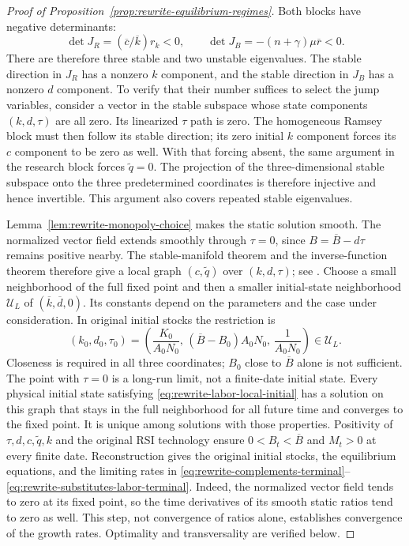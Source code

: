 \begin{proof}[Proof of Proposition~\ref{prop:rewrite-equilibrium-regimes}]
Both blocks have negative determinants:
\[
 \det J_R=(\overline c/\overline k)r_k<0,\qquad
 \det J_B=-(n+\gamma)\mu\overline r<0.
\]
There are therefore three stable and two unstable eigenvalues. The stable
direction in $J_R$ has a nonzero $k$ component, and the stable direction in
$J_B$ has a nonzero $d$ component. To verify that their number suffices to
select the jump variables, consider a vector in the stable subspace whose
state components $(k,d,\tau)$ are all zero. Its linearized $\tau$ path is
zero. The homogeneous Ramsey block must then follow its stable direction;
its zero initial $k$ component forces its $c$ component to be zero as well.
With that forcing absent, the same argument in the research block forces
$\widetilde q=0$. The projection of the three-dimensional stable subspace
onto the three predetermined coordinates is therefore injective and hence
invertible. This argument also covers repeated stable eigenvalues.

Lemma~\ref{lem:rewrite-monopoly-choice} makes the static solution smooth.
The normalized vector field extends smoothly through $\tau=0$, since
$B=\overline B-d\tau$ remains positive nearby. The stable-manifold theorem
and the inverse-function theorem therefore give a local graph
$(c,\widetilde q)$ over $(k,d,\tau)$; see \citet{dyatlov2018}.
Choose a small neighborhood of the full fixed point and then a smaller
initial-state neighborhood $\mathcal U_L$ of
$(\overline k,\overline d,0)$. Its constants depend on the parameters
and the case under consideration. In original initial stocks the restriction is
\begin{equation}
 (k_0,d_0,\tau_0)=
 \left(\frac{K_0}{A_0N_0},\,
       (\overline B-B_0)A_0N_0,\,
       \frac{1}{A_0N_0}\right)\in\mathcal U_L.
 \label{eq:rewrite-labor-local-initial}
\end{equation}
Closeness is required in all three coordinates; $B_0$ close to
$\overline B$ alone is not sufficient. The point with $\tau=0$
is a long-run limit, not a finite-date initial state.
Every physical initial state satisfying
\eqref{eq:rewrite-labor-local-initial} has a solution on this
graph that stays in the full neighborhood for all future time and converges
to the fixed point. It is unique among solutions with those properties.
Positivity of $\tau,d,c,\widetilde q,k$ and the original RSI technology
ensure $0<B_t<\overline B$ and $M_t>0$ at every finite date.
Reconstruction gives the original initial stocks, the equilibrium equations,
and the limiting rates in
\eqref{eq:rewrite-complements-terminal}--\eqref{eq:rewrite-substitutes-labor-terminal}.
Indeed, the normalized vector field tends to zero at its fixed point, so
the time derivatives of its smooth static ratios tend to zero as well.
This step, not convergence of ratios alone, establishes convergence of
the growth rates.
Optimality and transversality are verified below.


\end{proof}
